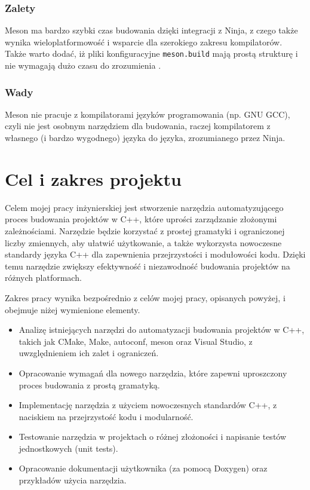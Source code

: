 \subsubsection{Zalety}
Meson ma bardzo szybki czas budowania dzięki integracji z Ninja, z czego także wynika wieloplatformowość i wsparcie dla szerokiego zakresu kompilatorów. Także warto dodać, iż  pliki konfiguracyjne \texttt{meson.build} mają prostą strukturę i nie wymagają dużo czasu do zrozumienia \cite{meson-sample}.

\subsubsection{Wady}
Meson nie pracuje z kompilatorami języków programowania (np. GNU GCC), czyli nie jest osobnym narzędziem dla budowania, raczej kompilatorem z własnego (i bardzo wygodnego) języka do języka, zrozumianego przez Ninja.

\section{Cel i zakres projektu}
Celem mojej pracy inżynierskiej jest stworzenie narzędzia automatyzującego proces budowania projektów w C++, które uprości zarządzanie złożonymi zależnościami. Narzędzie będzie korzystać z prostej gramatyki i ograniczonej liczby zmiennych, aby ułatwić użytkowanie, a także wykorzysta nowoczesne standardy języka C++ dla zapewnienia przejrzystości i modułowości kodu. Dzięki temu narzędzie zwiększy efektywność i niezawodność budowania projektów na różnych platformach.

Zakres pracy wynika bezpośrednio z celów mojej pracy, opisanych powyżej, i obejmuje niżej wymienione elementy.
\begin{itemize}
    \item Analizę istniejących narzędzi do automatyzacji budowania projektów w C++, takich jak CMake, Make, autoconf, meson oraz Visual Studio, z uwzględnieniem ich zalet i ograniczeń.
    \item Opracowanie wymagań dla nowego narzędzia, które zapewni uproszczony proces budowania z prostą gramatyką.
    \item Implementację narzędzia z użyciem nowoczesnych standardów C++, z naciskiem na przejrzystość kodu i modularność.
    \item Testowanie narzędzia w projektach o różnej złożoności i napisanie testów jednostkowych (unit tests).
    \item Opracowanie dokumentacji użytkownika (za pomocą Doxygen) oraz przykładów użycia narzędzia.
\end{itemize}